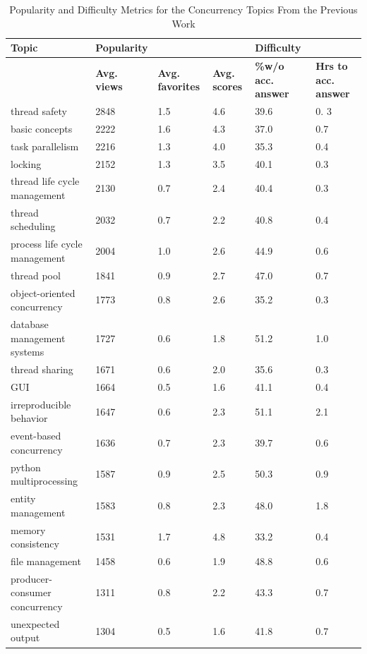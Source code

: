 \begin{table}[tbp]
\caption{Popularity and Difficulty Metrics for the Concurrency Topics From the Previous Work \cite{ahmed2018concurrency}}
\label{CP}
\begin{tabular}{p{1.7in}p{.5in}p{.6in}p{.4in}p{.9in}p{.9in}} \\ \hline
\textbf{Topic} & \textbf{Popularity} & & & \textbf{Difficulty} \\\hline
& \textbf{Avg. views} & \textbf{Avg. favorites} & \textbf{Avg. scores} & \textbf{\%w/o acc. answer} & \textbf{Hrs to acc. answer}\\ \hline
thread safety & 2848 & 1.5 & 4.6 & 39.6 & 0. 3\\ 
basic concepts & 2222 & 1.6 & 4.3 & 37.0 & 0.7 \\ 
task parallelism & 2216 & 1.3 & 4.0 & 35.3 & 0.4 \\ 
locking & 2152 & 1.3 & 3.5 & 40.1 & 0.3\\ 
thread life cycle management & 2130 & 0.7 & 2.4 & 40.4 & 0.3\\ 
thread scheduling & 2032 & 0.7 & 2.2 & 40.8 & 0.4\\ 
process life cycle management & 2004 & 1.0 & 2.6 & 44.9 & 0.6\\ 
thread pool & 1841 & 0.9 & 2.7 & 47.0 & 0.7\\ 
object-oriented concurrency & 1773 & 0.8 & 2.6 & 35.2 & 0.3\\ 
database management systems & 1727 & 0.6 & 1.8 & 51.2 & 1.0\\ 
thread sharing & 1671 & 0.6 & 2.0 & 35.6 & 0.3\\ 
GUI & 1664 & 0.5 & 1.6 & 41.1 & 0.4\\ 
irreproducible behavior & 1647 & 0.6 & 2.3 & 51.1 & 2.1\\ 
event-based concurrency & 1636 & 0.7 & 2.3 & 39.7 & 0.6 \\ 
python multiprocessing & 1587 & 0.9 & 2.5 & 50.3 & 0.9 \\ 
entity management & 1583 & 0.8 & 2.3 & 48.0 & 1.8\\ 
memory consistency & 1531 & 1.7 & 4.8 & 33.2 & 0.4\\ 
file management & 1458 & 0.6 & 1.9 & 48.8 & 0.6\\ 
producer-consumer concurrency & 1311 & 0.8 & 2.2 & 43.3 & 0.7\\ 
unexpected output & 1304 & 0.5 & 1.6 & 41.8 & 0.7\\ 

\end{tabular}
\end{table}
